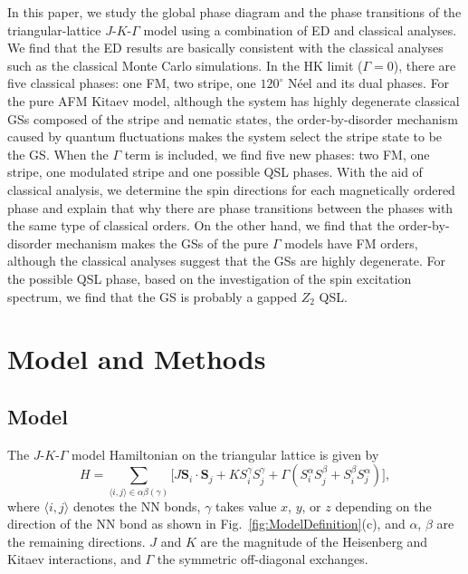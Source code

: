 \documentclass[aps,prb,reprint,amsfonts,amsmath,amssymb,showpacs,groupedaddress,superscriptaddress]{revtex4-1}
\begin{document}
In this paper, we study the global phase diagram and the phase transitions of the triangular-lattice $J$-$K$-$\Gamma$ model using a combination of ED and classical analyses. We find that the ED results are basically consistent with the classical analyses such as the classical Monte Carlo simulations. In the HK limit ($\Gamma=0$), there are five classical phases: one FM, two stripe, one $120^{\circ}$ N\'{e}el and its dual phases. For the pure AFM Kitaev model, although the system has highly degenerate classical GSs composed of the stripe and nematic states, the order-by-disorder mechanism caused by quantum fluctuations makes the system select the stripe state to be the GS. When the $\Gamma$ term is included, we find five new phases: two FM, one stripe, one modulated stripe and one possible QSL phases. With the aid of classical analysis, we determine the spin directions for each magnetically ordered phase and explain that why there are phase transitions between the phases with the same type of classical orders. On the other hand, we find that the order-by-disorder mechanism makes the GSs of the pure $\Gamma$ models have FM orders, although the classical analyses suggest that the GSs are highly degenerate. For the possible QSL phase, based on the investigation of the spin excitation spectrum, we find that the GS is probably a gapped $Z_{2}$ QSL.


\section{Model and Methods}

\subsection{\label{sec:Model}Model}

The $J$-$K$-$\Gamma$ model Hamiltonian on the triangular lattice is given by
\begin{equation}
    H = \sum_{\langle i,j \rangle \in \alpha \beta (\gamma)} \lbrack J \bm{S}_i \cdot \bm{S}_j + K S_i^{\gamma} S_j^{\gamma} + \Gamma (S_i^{\alpha} S_j^{\beta} + S_i^{\beta} S_j^{\alpha}) \rbrack,
    \label{eq:Hamiltonian}
\end{equation}
where $\langle i,j \rangle$ denotes the NN bonds, $\gamma$ takes value $x$, $y$, or $z$ depending on the direction of the NN bond as shown in Fig.~\ref{fig:ModelDefinition}(c), and $\alpha$, $\beta$ are the remaining directions. $J$ and $K$ are the magnitude of the Heisenberg and Kitaev interactions, and $\Gamma$ the symmetric off-diagonal exchanges.
\end{document}
